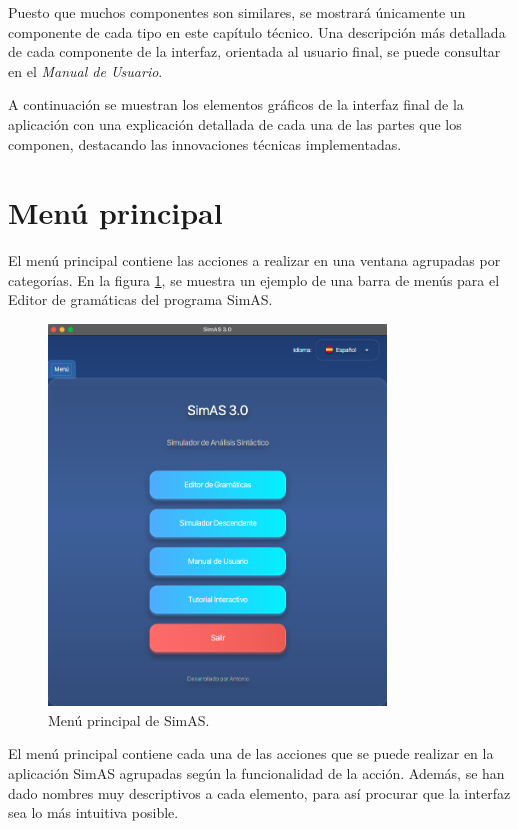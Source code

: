 Puesto que muchos componentes son similares, se mostrará únicamente un componente de cada tipo en este capítulo técnico. Una descripción más detallada de cada componente de la interfaz, orientada al usuario final, se puede consultar en el \textit{Manual de Usuario}.

A continuación se muestran los elementos gráficos de la interfaz final de la aplicación con una explicación detallada de cada una de las partes que los componen, destacando las innovaciones técnicas implementadas.

\section{Menú principal}

El menú principal contiene las acciones a realizar en una ventana agrupadas por categorías. En la figura \ref{fig:d1}, se muestra un ejemplo de una barra de menús para el Editor de gramáticas del programa SimAS.

\needspace{8cm}
\begin{figure}[H]
\centering
\includegraphics[width=0.8\textwidth]{figuras2/menu.png}
\caption{Menú principal de SimAS.}
\label{fig:d1}
\end{figure}

El menú principal contiene cada una de las acciones que se puede realizar en la aplicación SimAS agrupadas según la funcionalidad de la acción. Además, se han dado nombres muy descriptivos a cada elemento, para así procurar que la interfaz sea lo más intuitiva posible. 

